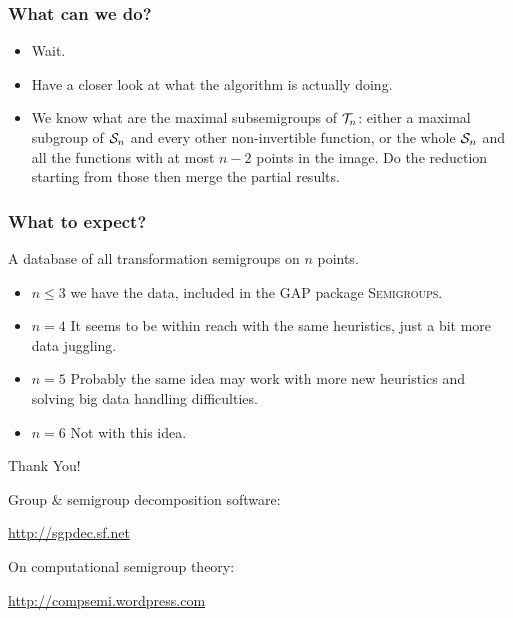 \documentclass{beamer}
\newcommand{\cS}{{\cal S}}
\newcommand{\cT}{{\cal T}}
\begin{document}
\begin{frame}\frametitle{What can we do?}

\begin{itemize}
\item Wait.
\item Have a closer look at what the algorithm is actually doing.
\item We know what are the maximal subsemigroups of $\cT_n$: either a maximal subgroup of $\cS_n$ and every other non-invertible function, or the whole $\cS_n$ and all the functions with at most $n-2$ points in the image. Do the reduction starting from those then merge the partial results.
\end{itemize}
\end{frame}


\begin{frame}\frametitle{What to expect?}
A database of all transformation semigroups on $n$ points.
\begin{itemize}
\item $n\leq 3$ we have the data, included in the \textsc{GAP} package \textsc{Semigroups}.
\item $n=4$ It seems to be within reach with the same heuristics, just a bit more data juggling.
\item $n=5$ Probably the same idea may work with more new heuristics and solving big data handling difficulties.
\item $n=6$ Not with this idea.
\end{itemize}
\end{frame}


\begin{frame}
\begin{center}\Huge Thank You!\end{center}
\normalsize

Group \& semigroup decomposition software:
\begin{center}
\url{http://sgpdec.sf.net}
\end{center}

On computational semigroup theory:
\begin{center}
\url{http://compsemi.wordpress.com}
\end{center}


\end{frame}
\end{document}
